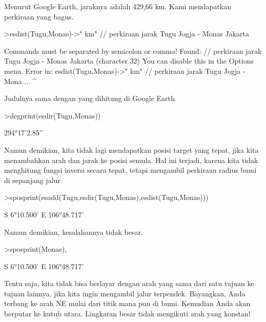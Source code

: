 \documentclass[a4paper,10pt]{article}
\begin{document}
\begin{eulernotebook}
\begin{eulercomment}
\begin{eulercomment}
\begin{eulercomment}
\begin{eulercomment}
\begin{eulercomment}
Menurut Google Earth, jaraknya adalah 429,66 km. Kami mendapatkan
perkiraan yang bagus.
\end{eulercomment}
\begin{eulerprompt}
>esdist(Tugu,Monas)->" km" // perkiraan jarak Tugu Jogja - Monas Jakarta
\end{eulerprompt}
\begin{euleroutput}
  Commands must be separated by semicolon or comma!
  Found:  // perkiraan jarak Tugu Jogja - Monas Jakarta (character 32)
  You can disable this in the Options menu.
  Error in:
  esdist(Tugu,Monas)->" km" // perkiraan jarak Tugu Jogja - Mona ...
                           ^
\end{euleroutput}
\begin{eulercomment}
Judulnya sama dengan yang dihitung di Google Earth.
\end{eulercomment}
\begin{eulerprompt}
>degprint(esdir(Tugu,Monas))
\end{eulerprompt}
\begin{euleroutput}
  294°17'2.85''
\end{euleroutput}
\begin{eulercomment}
Namun demikian, kita tidak lagi mendapatkan posisi target yang tepat,
jika kita menambahkan arah dan jarak ke posisi semula. Hal ini
terjadi, karena kita tidak menghitung fungsi inversi secara tepat,
tetapi mengambil perkiraan radius bumi di sepanjang jalur.
\end{eulercomment}
\begin{eulerprompt}
>sposprint(esadd(Tugu,esdir(Tugu,Monas),esdist(Tugu,Monas)))
\end{eulerprompt}
\begin{euleroutput}
  S 6°10.500' E 106°48.717'
\end{euleroutput}
\begin{eulercomment}
Namun demikian, kesalahannya tidak besar.
\end{eulercomment}
\begin{eulerprompt}
>sposprint(Monas),
\end{eulerprompt}
\begin{euleroutput}
  S 6°10.500' E 106°48.717'
\end{euleroutput}
\begin{eulercomment}
Tentu saja, kita tidak bisa berlayar dengan arah yang sama dari satu
tujuan ke tujuan lainnya, jika kita ingin mengambil jalur terpendek.
Bayangkan, Anda terbang ke arah NE mulai dari titik mana pun di bumi.
Kemudian Anda akan berputar ke kutub utara. Lingkaran besar tidak
mengikuti arah yang konstan!


\end{eulercomment}
\end{eulercomment}
\end{eulercomment}
\end{eulercomment}
\end{eulercomment}
\end{eulernotebook}
\end{document}

